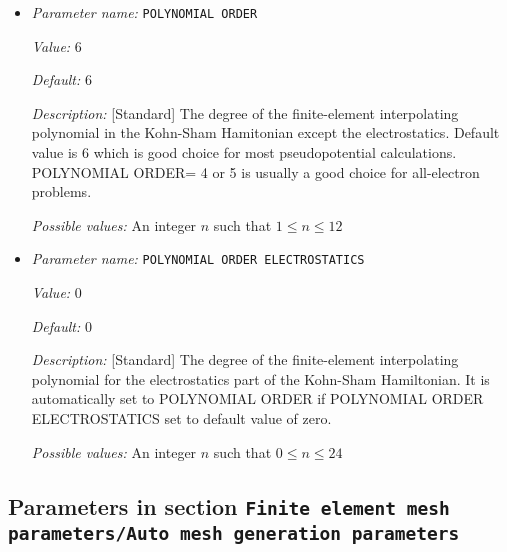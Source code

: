 \begin{itemize}
\item {\it Parameter name:} {\tt POLYNOMIAL ORDER}
\label{parameters:Finite element mesh parameters/POLYNOMIAL ORDER}
\label{parameters:Finite_20element_20mesh_20parameters/POLYNOMIAL_20ORDER}


{\it Value:} 6


{\it Default:} 6


{\it Description:} [Standard] The degree of the finite-element interpolating polynomial in the Kohn-Sham Hamitonian except the electrostatics. Default value is 6 which is good choice for most pseudopotential calculations. POLYNOMIAL ORDER= 4 or 5 is usually a good choice for all-electron problems.


{\it Possible values:} An integer $n$ such that $1\leq n \leq 12$
\item {\it Parameter name:} {\tt POLYNOMIAL ORDER ELECTROSTATICS}
\label{parameters:Finite element mesh parameters/POLYNOMIAL ORDER ELECTROSTATICS}
\label{parameters:Finite_20element_20mesh_20parameters/POLYNOMIAL_20ORDER_20ELECTROSTATICS}


{\it Value:} 0


{\it Default:} 0


{\it Description:} [Standard] The degree of the finite-element interpolating polynomial for the electrostatics part of the Kohn-Sham Hamiltonian. It is automatically set to POLYNOMIAL ORDER if POLYNOMIAL ORDER ELECTROSTATICS set to default value of zero.


{\it Possible values:} An integer $n$ such that $0\leq n \leq 24$
\end{itemize}



\subsection{Parameters in section \tt Finite element mesh parameters/Auto mesh generation parameters}
\label{parameters:Finite_20element_20mesh_20parameters/Auto_20mesh_20generation_20parameters}

